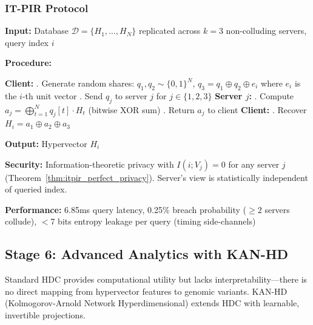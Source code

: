 \documentclass[12pt,a4paper]{article}
\begin{document}
\subsubsection{IT-PIR Protocol}

\textbf{Input:} Database $\mathcal{D} = \{H_1, \ldots, H_N\}$ replicated across $k = 3$ non-colluding servers, query index $i$

\textbf{Procedure:}
\begin{algorithmic}
\STATE \textbf{Client:}
\STATE {}. Generate random shares: $q_1, q_2 \sim \{0,1\}^N$, $q_3 = q_1 \oplus q_2 \oplus e_i$
\STATE \quad \quad where $e_i$ is the $i$-th unit vector
\STATE {}. Send $q_j$ to server $j$ for $j \in \{1,2,3\}$
\STATE
\STATE \textbf{Server $j$:}
\STATE {}. Compute $a_j = \bigoplus_{t=1}^N q_j[t] \cdot H_t$ (bitwise XOR sum)
\STATE {}. Return $a_j$ to client
\STATE
\STATE \textbf{Client:}
\STATE {}. Recover $H_i = a_1 \oplus a_2 \oplus a_3$
\end{algorithmic}

\textbf{Output:} Hypervector $H_i$

\textbf{Security:} Information-theoretic privacy with $I(i; V_j) = 0$ for any server $j$ (Theorem~\ref{thm:itpir_perfect_privacy}). Server's view is statistically independent of queried index.

\textbf{Performance:} 6.85ms query latency, 0.25\% breach probability ($\geq 2$ servers collude), $<$7 bits entropy leakage per query (timing side-channels)

\subsection{Stage 6: Advanced Analytics with KAN-HD}

Standard HDC provides computational utility but lacks interpretability---there is no direct mapping from hypervector features to genomic variants. KAN-HD (Kolmogorov-Arnold Network Hyperdimensional) extends HDC with learnable, invertible projections.
\end{document}
